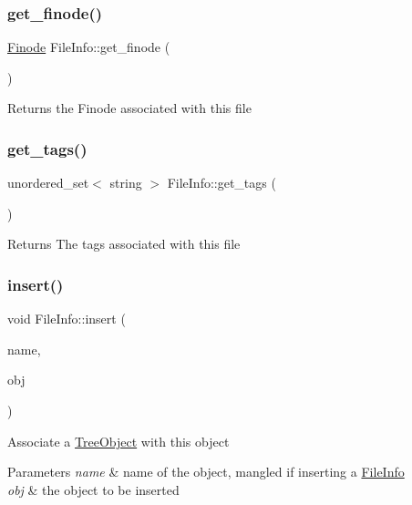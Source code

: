 \subsubsection{\texorpdfstring{get\+\_\+finode()}{get\_finode()}}
{\footnotesize\ttfamily \mbox{\hyperlink{structfinode}{Finode}} File\+Info\+::get\+\_\+finode (\begin{DoxyParamCaption}{ }\end{DoxyParamCaption})}

\begin{DoxyReturn}{Returns}
the Finode associated with this file 
\end{DoxyReturn}
\mbox{\label{classFileInfo_a63d01334c1c2ae22e5d1930afa5c74d4}} 
\subsubsection{\texorpdfstring{get\+\_\+tags()}{get\_tags()}}
{\footnotesize\ttfamily unordered\+\_\+set$<$ string $>$ File\+Info\+::get\+\_\+tags (\begin{DoxyParamCaption}{ }\end{DoxyParamCaption})}

\begin{DoxyReturn}{Returns}
The tags associated with this file 
\end{DoxyReturn}
\mbox{\label{classFileInfo_ad93a84b63e417b07aa68b619051ab746}} 
\subsubsection{\texorpdfstring{insert()}{insert()}}
{\footnotesize\ttfamily void File\+Info\+::insert (\begin{DoxyParamCaption}\item[{string}]{name,  }\item[{\mbox{\hyperlink{classTreeObject}{Tree\+Object}} $\ast$}]{obj }\end{DoxyParamCaption})\hspace{0.3cm}{\ttfamily [virtual]}}

Associate a \mbox{\hyperlink{classTreeObject}{Tree\+Object}} with this object 
\begin{DoxyParams}{Parameters}
{\em name} & name of the object, mangled if inserting a \mbox{\hyperlink{classFileInfo}{File\+Info}} \\
\hline
{\em obj} & the object to be inserted \\
\hline
\end{DoxyParams}

